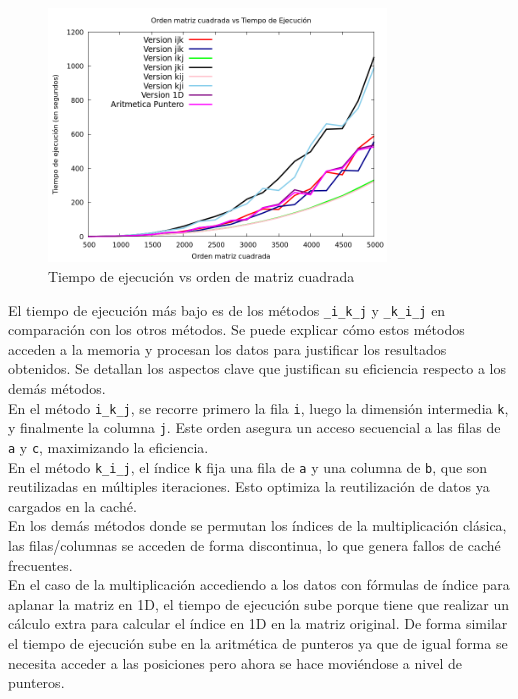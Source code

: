 \documentclass[10pt]{article}
\begin{document}
\begin{figure}[H]
    \centering
    \includegraphics[width=0.8\textwidth]{grafico.png}
    \caption{Tiempo de ejecución vs orden de matriz cuadrada}
    \label{fig:tiempo_ejecucion}
\end{figure}

El tiempo de ejecución más bajo es de los métodos \texttt{\_i\_k\_j} y \texttt{\_k\_i\_j} en comparación con los otros métodos. Se puede explicar cómo estos métodos acceden a la memoria y procesan los datos para justificar los resultados obtenidos. Se detallan los aspectos clave que justifican su eficiencia respecto a los demás métodos.\\

En el método \texttt{i\_k\_j}, se recorre primero la fila \texttt{i}, luego la dimensión intermedia \texttt{k}, y finalmente la columna \texttt{j}. Este orden asegura un acceso secuencial a las filas de \texttt{a} y \texttt{c}, maximizando la eficiencia.\\

En el método \texttt{k\_i\_j}, el índice \texttt{k} fija una fila de \texttt{a} y una columna de \texttt{b}, que son reutilizadas en múltiples iteraciones. Esto optimiza la reutilización de datos ya cargados en la caché.\\

En los demás métodos donde se permutan los índices de la multiplicación clásica, las filas/columnas se acceden de forma discontinua, lo que genera fallos de caché frecuentes.\\

En el caso de la multiplicación accediendo a los datos con fórmulas de índice para aplanar la matriz en 1D, el tiempo de ejecución sube porque tiene que realizar un cálculo extra para calcular el índice en 1D en la matriz original. De forma similar el tiempo de ejecución sube en la aritmética de punteros ya que de igual forma se necesita acceder a las posiciones pero ahora se hace moviéndose a nivel de punteros.\\
\end{document}
